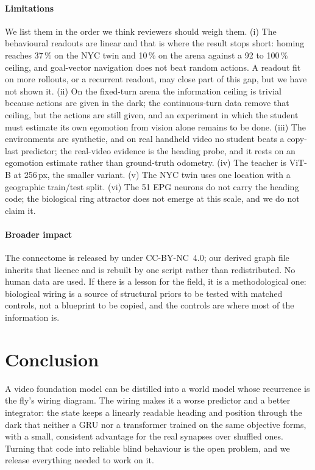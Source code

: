 \paragraph{Limitations}
We list them in the order we think reviewers should weigh them. (i) The behavioural readouts are linear and that is
where the result stops short: homing reaches 37\,\% on the NYC twin and 10\,\% on the arena against a 92 to 100\,\%
ceiling, and goal-vector navigation does not beat random actions. A readout fit on more rollouts, or a recurrent
readout, may close part of this gap, but we have not shown it. (ii) On the fixed-turn arena the information ceiling is
trivial because actions are given in the dark; the continuous-turn data remove that ceiling, but the actions are still
given, and an experiment in which the student must estimate its own egomotion from vision alone remains to be done.
(iii) The environments are synthetic, and on real handheld video no student beats a copy-last predictor; the
real-video evidence is the heading probe, and it rests on an egomotion estimate rather than ground-truth odometry. (iv) The teacher is ViT-B at 256\,px,
the smaller \vjepa variant. (v) The NYC twin uses one location with a geographic train/test split. (vi) The
51 EPG neurons do not carry the heading code; the biological ring attractor does not emerge at this scale, and we do
not claim it.

\paragraph{Broader impact}
The connectome is released by \flywire under CC-BY-NC~4.0; our derived graph file inherits that licence and is rebuilt
by one script rather than redistributed. No human data are used. If there is a lesson for the field, it is a
methodological one: biological wiring is a source of structural priors to be tested with matched controls, not a
blueprint to be copied, and the controls are where most of the information is.

\section{Conclusion}
A video foundation model can be distilled into a world model whose recurrence is the fly's wiring diagram. The wiring
makes it a worse predictor and a better integrator: the state keeps a linearly readable heading and position through
the dark that neither a GRU nor a transformer trained on the same objective forms, with a small, consistent advantage
for the real synapses over shuffled ones. Turning that code into reliable blind behaviour is the open problem, and we release
everything needed to work on it.
